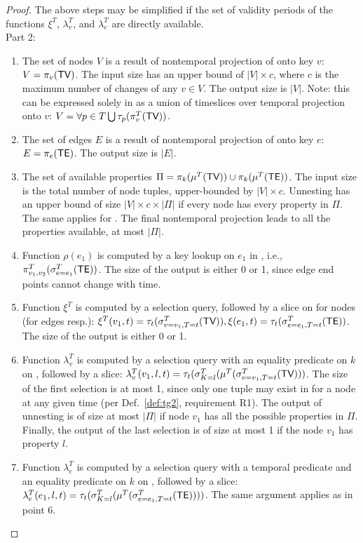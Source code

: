 \begin{proof}
The above steps may be simplified if the set of validity periods of
the functions $\xi^T$, $\lambda^T_v$, and $\lambda^T_e$ are directly
available.
\\
Part 2:

\begin{enumerate}[itemindent=\dimexpr\labelwidth+\labelsep\relax,leftmargin=0pt]
\item The set of nodes $V$ is a result of nontemporal projection of
  \tv onto key $v$: $V = \pi_v(\textsf{TV})$.  The input size has an upper
  bound of $|V| \times c$, where $c$ is the maximum number of changes
  of any $v \in V$.  The output size is $|V|$.  Note: this can be
  expressed solely in \tra as a union of timeslices over temporal
  projection onto $v$: $V = \forall p \in T \bigcup
  \tau_p(\pi^T_v(\textsf{TV}))$.
\item The set of edges $E$ is a result of nontemporal projection of
  \te onto key $e$: $E = \pi_e(\textsf{TE})$.  The output size is $|E|$.
\item The set of available properties $\Pi = \pi_k(\mu^T(\textsf{TV})) \cup
  \pi_k(\mu^T(\textsf{TE}))$.  The input size is the total number of node
  tuples, upper-bounded by $|V| \times c$.  Unnesting \tv has an upper
  bound of size $|V| \times c \times |\Pi|$ if every node has every
  property in $\Pi$. The same applies for \te.  The final nontemporal
  projection leads to all the properties available, at most $|\Pi|$.
\item Function $\rho(e_1)$ is computed by a key lookup on $e_1$ in \te, i.e.,
  $\pi^T_{v_1,v_2}(\sigma^T_{e=e_1}(\textsf{TE}))$.  The size of the output is
  either 0 or 1, since edge end points cannot change with time.
\item Function $\xi^T$ is computed by a
  selection query, followed by a slice on \tv for nodes (\te for edges
  resp.): $\xi^T(v_1,t) = \tau_t(\sigma^T_{v=v_1,T=t}(\textsf{TV})), \xi(e_1,t)
  = \tau_t(\sigma^T_{e=e_1,T=t}(\textsf{TE}))$.  The size of the output is
  either 0 or 1.
\item Function $\lambda^T_v$ is computed by a selection query with an
  equality predicate on $k$ on \tv, followed by a slice:
  $\lambda^T_v(v_1,l,t) =
  \tau_t(\sigma^T_{K=l}(\mu^T(\sigma^T_{v=v_1,T=t}(\textsf{TV})))$.  The size
  of the first selection is at most 1, since only one tuple may exist
  in \tv for a node at any given time (per Def.~\ref{def:tg2},
  requirement R1).  The output of unnesting is of size at most $|\Pi|$
  if node $v_1$ has all the possible properties in $\Pi$.  Finally,
  the output of the last selection is of size at most 1 if the node
  $v_1$ has property $l$.
\item Function $\lambda^T_e$ is computed by a selection query with a
  temporal predicate and an equality predicate on $k$ on \te, followed
  by a slice: $\lambda^T_e(e_1,l,t) =
  \tau_t(\sigma^T_{K=l}(\mu^T(\sigma^T_{e=e_1,T=t}(\textsf{TE}))))$.  The same
  argument applies as in point 6.
\end{enumerate}
\end{proof}

